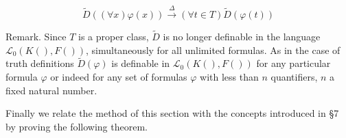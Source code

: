$$\tilde{D}((\forall x)\varphi(x)) \xrightarrow{\Delta} (\forall t \in T) \tilde{D}(\varphi(t))$$

Remark. Since $T$ is a proper class, $\tilde{D}$ is no longer definable in the language $\mathcal{L}_0(K(), F())$, simultaneously for all unlimited formulas. As in the case of truth definitions $\tilde{D}(\varphi)$ is definable in $\mathcal{L}_0(K(), F())$ for any particular formula $\varphi$ or indeed for any set of formulas $\varphi$ with less than $n$ quantifiers, $n$ a fixed natural number.

Finally we relate the method of this section with the concepts introduced in §7 by proving the following theorem.
